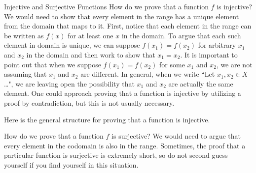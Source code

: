 \begin{section}{Injective and Surjective Functions}
How do we prove that a function $f$ is injective? We would need to show that every element in the range has a unique element from the domain that maps to it. First, notice that each element in the range can be written as $f(x)$ for at least one $x$ in the domain.  To argue that each such element in domain is unique, we can suppose $f(x_{1})=f(x_{2})$ for arbitrary $x_1$ and $x_2$ in the domain and then work to show that $x_{1}=x_{2}$.  It is important to point out that when we suppose $f(x_{1})=f(x_{2})$ for some $x_1$ and $x_2$, we are not assuming that $x_1$ and $x_2$ are different. In general, when we write ``Let $x_1,x_2\in X$\ldots", we are leaving open the possibility that $x_1$ and $x_2$ are actually the same element. One could approach proving that a function is injective by utilizing a proof by contradiction, but this is not usually necessary.

\begin{skeleton}
Here is the general structure for proving that a function is injective.
\begin{center}
\end{center}
\end{skeleton}

How do we prove that a function $f$ is surjective? We would need to argue that every element in the codomain is also in the range.  Sometimes, the proof that a particular function is surjective is extremely short, so do not second guess yourself if you find yourself in this situation.  


\end{section}
